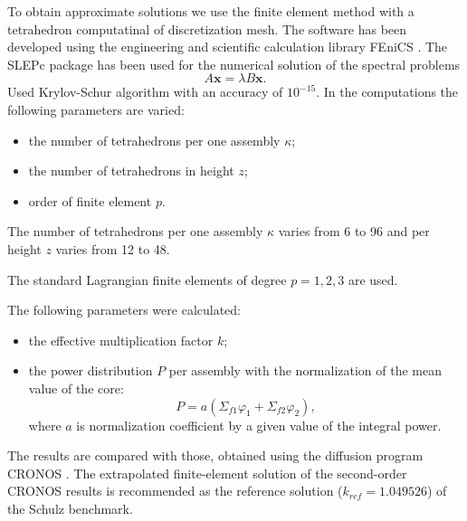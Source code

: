 \documentclass[runningheads,a4paper]{llncs}
\begin{document}
To obtain approximate solutions we use the finite element method \cite{brenner} 
with a tetrahedron computatinal of discretization mesh. The software has been developed using the engineering and scientific calculation library FEniCS \cite{logg2012automated}. The SLEPc package \cite{slepc} has been used for the numerical solution of the spectral problems
\begin{equation}\label{8}
A\bm{x} = \lambda B \bm{x}.
\end{equation}
Used Krylov-Schur algorithm with an accuracy of $10^{-15}$. In the computations the following parameters are varied:
\begin{itemize}\itemsep1pt \parskip0pt 
\item the number of tetrahedrons per one assembly $\kappa$; 
\item the number of tetrahedrons in height $z$; 
\item order of finite element $p$.
\end{itemize}
The number of tetrahedrons per one assembly $\kappa$  varies from 6 to 96 and per height $z$ varies from 12 to 48. 

The standard Lagrangian finite elements of degree $p=1,2,3$ are used.


The following parameters were calculated:
\begin{itemize}\itemsep1pt \parskip0pt 
\item the effective multiplication factor $k$;
\item the power distribution  $P$ per assembly with the normalization of the mean value of the core:
\begin{equation}\label{9}
P = a(\Sigma_{f1} \varphi_1 + \Sigma_{f2} \varphi_2),
\end{equation}
where $a$ is normalization coefficient by a given value of the integral power.
\end{itemize}

The results are compared with those, obtained using the diffusion program CRONOS \cite{cronos}. The extrapolated finite-element solution of the second-order CRONOS results is recommended as the reference solution ($k_{ref} = 1.049526$) of the Schulz benchmark. 
\end{document}
